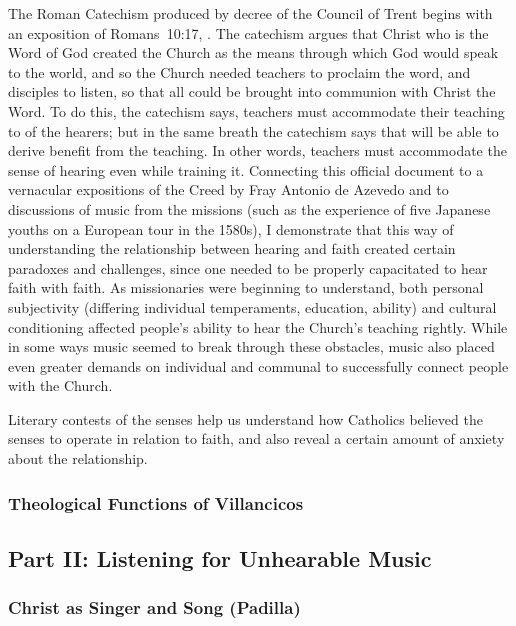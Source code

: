 \documentclass{vcbook-proposal}
\begin{document}
The Roman Catechism produced by decree of the Council of Trent begins with an exposition of Romans~10:17, .
The catechism argues that Christ who is the Word of God created the Church as the means through which God would speak to the world, and so the Church needed teachers to proclaim the word, and disciples to listen, so that all could be brought into communion with Christ the Word.
To do this, the catechism says, teachers must accommodate their teaching to  of the hearers; but in the same breath the catechism says that  will be able to derive benefit from the teaching.
In other words, teachers must accommodate the sense of hearing even while training it.
Connecting this official document to a vernacular expositions of the Creed by Fray Antonio de Azevedo and to discussions of music from the missions (such as the experience of five Japanese youths on a European tour in the 1580s), I demonstrate that this way of understanding the relationship between hearing and faith created certain paradoxes and challenges, since one needed to be properly capacitated to hear faith with faith.
As missionaries were beginning to understand, both personal subjectivity (differing individual temperaments, education, ability) and cultural conditioning affected people's ability to hear the Church's teaching rightly.
While in some ways music seemed to break through these obstacles, music also placed even greater demands on individual and communal  to successfully connect people with the Church.

Literary contests of the senses help us understand how Catholics believed the senses to operate in relation to faith, and also reveal a certain amount of anxiety about the relationship.


\subsubsection{Theological Functions of Villancicos}


\subsection{Part II: Listening for Unhearable Music}

\subsubsection{Christ as Singer and Song (Padilla)}
\end{document}
